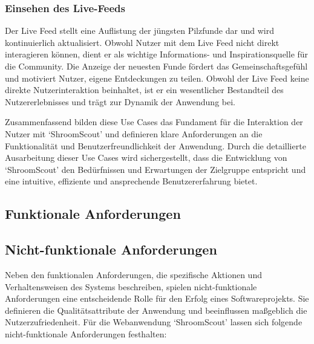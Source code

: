 \documentclass[../main.tex]{subfiles} %
\begin{document}
\subsubsection{Einsehen des Live-Feeds}

Der Live Feed stellt eine Auflistung der jüngsten Pilzfunde dar und wird kontinuierlich aktualisiert. Obwohl Nutzer mit dem
Live Feed nicht direkt interagieren können, dient er als wichtige Informations- und Inspirationsquelle für die Community.
Die Anzeige der neuesten Funde fördert das Gemeinschaftsgefühl und motiviert Nutzer, eigene Entdeckungen zu teilen. Obwohl der
Live Feed keine direkte Nutzerinteraktion beinhaltet, ist er ein wesentlicher Bestandteil des Nutzererlebnisses und trägt zur
Dynamik der Anwendung bei.

Zusammenfassend bilden diese Use Cases das Fundament für die Interaktion der Nutzer mit `ShroomScout' und definieren klare
Anforderungen an die Funktionalität und Benutzerfreundlichkeit der Anwendung. Durch die detaillierte Ausarbeitung dieser Use
Cases wird sichergestellt, dass die Entwicklung von `ShroomScout' den Bedürfnissen und Erwartungen der Zielgruppe entspricht
und eine intuitive, effiziente und ansprechende Benutzererfahrung bietet.

\subsection{Funktionale Anforderungen} %

\subsection{Nicht-funktionale Anforderungen} %

Neben den funktionalen Anforderungen, die spezifische Aktionen und Verhaltensweisen des Systems beschreiben, spielen
nicht-funktionale Anforderungen eine entscheidende Rolle für den Erfolg eines Softwareprojekts. Sie definieren die
Qualitätsattribute der Anwendung und beeinflussen maßgeblich die Nutzerzufriedenheit. Für die Webanwendung `ShroomScout'
lassen sich folgende nicht-funktionale Anforderungen festhalten:
\end{document}
